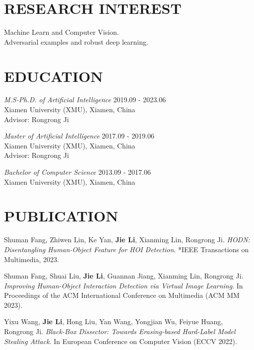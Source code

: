 \documentclass[margin, 10pt]{res} %
\begin{document}
\begin{resume}


\section{RESEARCH INTEREST}
Machine Learn and Computer Vision. \\
Adversarial examples and robust deep learning.



\section{EDUCATION}

{\sl M.S-Ph.D. of Artificial Intelligence} \hfill 2019.09 - 2023.06 \\
Xiamen University (XMU), Xiamen, China \\
Advisor: Rongrong Ji

{\sl Master of Artificial Intelligence} \hfill 2017.09 - 2019.06 \\
Xiamen University (XMU), Xiamen, China \\
Advisor: Rongrong Ji

{\sl Bachelor of Computer Science} \hfill 2013.09 - 2017.06 \\
Xiamen University (XMU), Xiamen, China

\section{PUBLICATION}

Shuman Fang, Zhiwen Lin, Ke Yan, \textbf{Jie Li}, Xianming Lin, Rongrong Ji. \textit{HODN: Disentangling Human-Object Feature for HOI Detection}.
*IEEE Transactions on Multimedia, 2023.

Shuman Fang, Shuai Liu, \textbf{Jie Li}, Guannan Jiang, Xianming Lin, Rongrong Ji. \textit{Improving Human-Object Interaction Detection via Virtual Image Learning}.
In Proceedings of the ACM International Conference on Multimedia (ACM MM 2023).

Yixu Wang, \textbf{Jie Li}, Hong Liu, Yan Wang, Yongjian Wu, Feiyue Huang, Rongrong Ji. \textit{Black-Box Dissector: Towards Erasing-based Hard-Label Model Stealing Attack}.
In European Conference on Computer Vision (ECCV 2022).


\end{resume}
\end{document}

